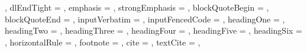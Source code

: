 {{    },
  dlEndTight = {%
    },
  emphasis = {%
    },
  strongEmphasis = {%
    },
  blockQuoteBegin = {%
    },
  blockQuoteEnd = {%
    },
  inputVerbatim = {%
    },
  inputFencedCode = {%
    },
  headingOne = {%
    },
  headingTwo = {%
    },
  headingThree = {%
    },
  headingFour = {%
    },
  headingFive = {%
    },
  headingSix = {%
    },
  horizontalRule = {%
    },
  footnote = {%
    },
  cite = {%
    },
  textCite = {%
    },
}
